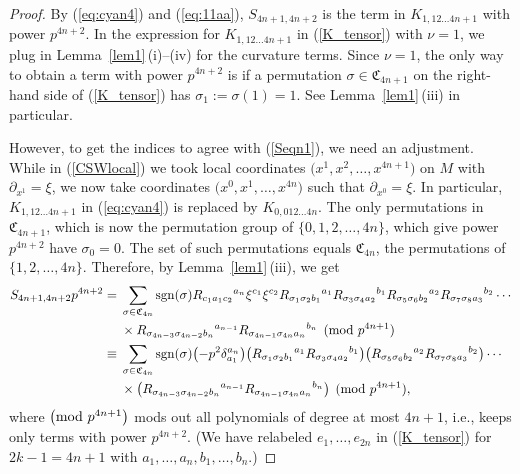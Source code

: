 \documentclass[pdftex]{sigma}
\numberwithin{equation}{section}
\theoremstyle{definition}
\newcommand{\sgn}{{\rm sgn}}
\newcommand{\barcurvature}[2]{R_{#1}{}^{#2}}
\begin{document}
\begin{proof}
By (\ref{eq:cyan4}) and (\ref{eq:11aa}), $S_{4n+1,4n+2}$ is the term in $K_{1,12\dots 4n+1}$ with power $p^{4n+2}$. In the expression for $K_{1,12\dots 4n+1}$ in (\ref{K_tensor}) with $\nu=1$, we plug in Lemma~\ref{lem1}\,(i)--(iv) for the curvature terms.
Since $\nu=1$, the only way to obtain a term with power $p^{4n+2}$
is if a permutation $\sigma\in \mathfrak{C}_{4n+1}$ on the right-hand side of (\ref{K_tensor}) has $\sigma_1 :=\sigma(1) =1$. See Lemma~\ref{lem1}\,(iii) in particular.

However, to get the indices to agree with (\ref{Seqn1}), we need an adjustment. While in (\ref{CSWlocal}) we took local coordinates $\bigl(x^1,x^2,\dots, x^{4n+1}\bigr)$ on $M$ with $\partial_{x^1} = \xi$, we now take coordinates $\bigl(x^0, x^1,\dots, x^{4n}\bigr)$ such that
$\partial_{x^0} = \xi$. In particular, $K_{1, 1 2\dots 4n+1}$ in (\ref{eq:cyan4}) is replaced by
$K_{0, 01 2\dots 4n}$. The only permutations in $\mathfrak{C}_{4n+1}$, which is now the permutation group of $\{0,1,2,\dots,4n\}$, which give power $p^{4n+2}$ have $\sigma_0=0$. The set of such permutations equals $\mathfrak{C}_{4n}$, the permutations of~$\{1,2,\dots,4n\}$. Therefore, by Lemma~\ref{lem1}\,(iii), we get
\begin{align*}
S_{4n+1,4n+2}p^{4n+2}
={}& \sum_{\sigma\in \mathfrak{C}_{4n}}
 \sgn(\sigma)
\barcurvature{c_1 a_1 c_2}{a_{n}}
\xi^{c_1} \xi^{c_2}
\barcurvature{\sigma_1 \sigma_2 b_1}{a_1}
\barcurvature{\sigma_3 \sigma_4 a_2}{b_1}
\barcurvature{\sigma_5 \sigma_6 b_2}{a_2}
\barcurvature{\sigma_7 \sigma_8 a_3}{b_2}
\cdots \\
 &\times
\barcurvature{\sigma_{4n-3} \sigma_{4n-2} b_n}{a_{n-1}}
\barcurvature{\sigma_{4n-1} \sigma_{4n} a_{n}}{b_n}
\pmod{p^{4n+1}}
\\
\equiv{}& \sum_{\sigma\in \mathfrak{C}_{4n}}
 \sgn(\sigma)
\bigl(-p^2 \delta_{a_1}^{a_{n}} \bigr)
\bigl(\barcurvature{\sigma_1 \sigma_2 b_1}{a_1}
\barcurvature{\sigma_3 \sigma_4 a_2}{b_1}\bigr)
\bigl(\barcurvature{\sigma_5 \sigma_6 b_2}{a_2}
\barcurvature{\sigma_7 \sigma_8 a_3}{b_2}\bigr)
\cdots \\
 &\times
\bigl(\barcurvature{\sigma_{4n-3} \sigma_{4n-2} b_{n}}{a_{n-1}}
\barcurvature{\sigma_{4n-1} \sigma_{4n} a_n}{b_{n}} \bigr)
\pmod{p^{4n+1}},
 \end{align*}
where
$\bigl({\rm mod}\ p^{4n+1}\bigr)$ mods out all polynomials of degree at most $4n+1$, i.e.,
keeps only terms with power $p^{4n+2}$. (We have relabeled $e_1,\dots,e_{2n}$ in
(\ref{K_tensor}) for $2k-1 = 4n+1$ with $a_1,\dots,a_n, b_1,\dots, b_n$.)


\end{proof}
\end{document}
